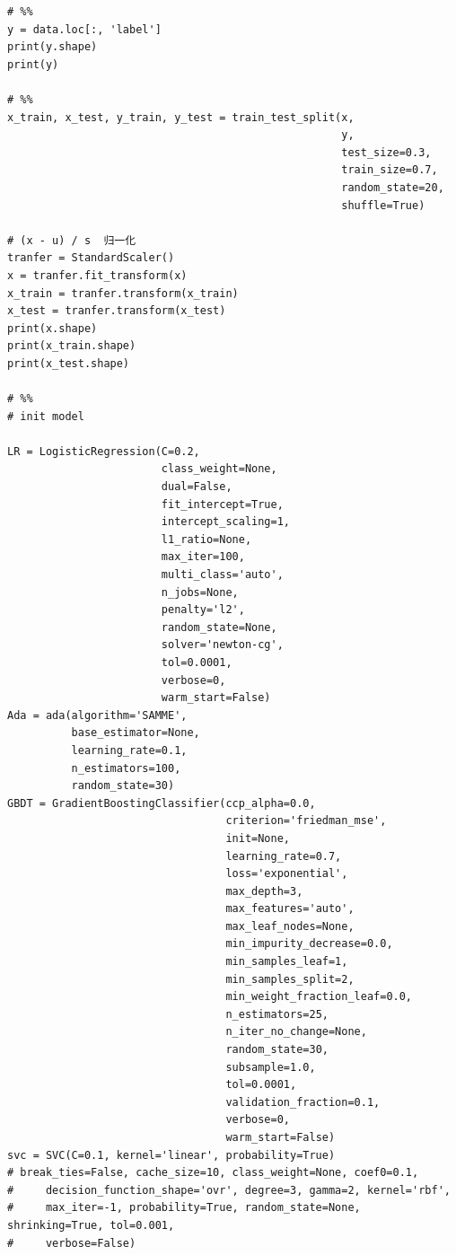 \documentclass[UTF8]{ctexart}
\begin{document}
\begin{lstlisting}
# %%
y = data.loc[:, 'label']
print(y.shape)
print(y)

# %%
x_train, x_test, y_train, y_test = train_test_split(x,
                                                    y,
                                                    test_size=0.3,
                                                    train_size=0.7,
                                                    random_state=20,
                                                    shuffle=True)

# (x - u) / s  归一化
tranfer = StandardScaler()
x = tranfer.fit_transform(x)
x_train = tranfer.transform(x_train)
x_test = tranfer.transform(x_test)
print(x.shape)
print(x_train.shape)
print(x_test.shape)

# %%
# init model

LR = LogisticRegression(C=0.2,
                        class_weight=None,
                        dual=False,
                        fit_intercept=True,
                        intercept_scaling=1,
                        l1_ratio=None,
                        max_iter=100,
                        multi_class='auto',
                        n_jobs=None,
                        penalty='l2',
                        random_state=None,
                        solver='newton-cg',
                        tol=0.0001,
                        verbose=0,
                        warm_start=False)
Ada = ada(algorithm='SAMME',
          base_estimator=None,
          learning_rate=0.1,
          n_estimators=100,
          random_state=30)
GBDT = GradientBoostingClassifier(ccp_alpha=0.0,
                                  criterion='friedman_mse',
                                  init=None,
                                  learning_rate=0.7,
                                  loss='exponential',
                                  max_depth=3,
                                  max_features='auto',
                                  max_leaf_nodes=None,
                                  min_impurity_decrease=0.0,
                                  min_samples_leaf=1,
                                  min_samples_split=2,
                                  min_weight_fraction_leaf=0.0,
                                  n_estimators=25,
                                  n_iter_no_change=None,
                                  random_state=30,
                                  subsample=1.0,
                                  tol=0.0001,
                                  validation_fraction=0.1,
                                  verbose=0,
                                  warm_start=False)
svc = SVC(C=0.1, kernel='linear', probability=True)
# break_ties=False, cache_size=10, class_weight=None, coef0=0.1,
#     decision_function_shape='ovr', degree=3, gamma=2, kernel='rbf',
#     max_iter=-1, probability=True, random_state=None, shrinking=True, tol=0.001,
#     verbose=False)


\end{lstlisting}
\end{document}
